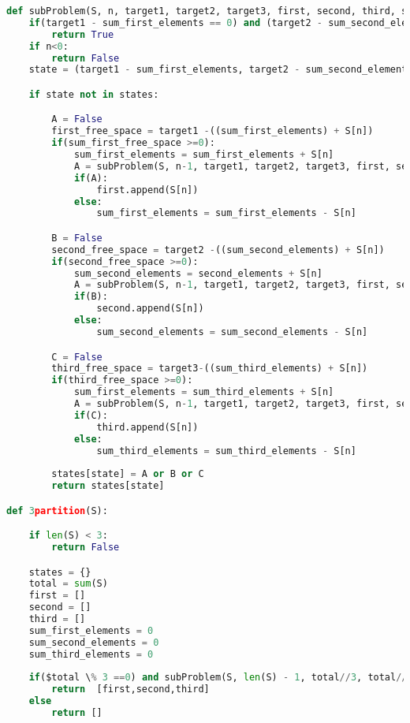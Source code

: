 \documentclass{article}
\begin{document}
\begin{lstlisting}[language=python,caption={},label={lst:uno}]
def subProblem(S, n, target1, target2, target3, first, second, third, sum_first_elements, sum_second_elements, sum_third_elements, states):
	if(target1 - sum_first_elements == 0) and (target2 - sum_second_elements ==0) and (target3 - sum_third_elements ==0):
		return True
	if n<0:
		return False
	state = (target1 - sum_first_elements, target2 - sum_second_elements, target3 - sum_third_elements, n)

	if state not in states:

		A = False
		first_free_space = target1 -((sum_first_elements) + S[n])
		if(sum_first_free_space >=0):
			sum_first_elements = sum_first_elements + S[n]
			A = subProblem(S, n-1, target1, target2, target3, first, second, third, sum_first_elements, sum_second_elements, sum_third_elements, states)
			if(A):
				first.append(S[n])
			else:
				sum_first_elements = sum_first_elements - S[n]

		B = False
		second_free_space = target2 -((sum_second_elements) + S[n])
		if(second_free_space >=0):
			sum_second_elements = second_elements + S[n]
			A = subProblem(S, n-1, target1, target2, target3, first, second, third, sum_first_elements, sum_second_elements, sum_third_elements, states)
			if(B):
				second.append(S[n])
			else:
				sum_second_elements = sum_second_elements - S[n]

		C = False
		third_free_space = target3-((sum_third_elements) + S[n])
		if(third_free_space >=0):
			sum_first_elements = sum_third_elements + S[n]
			A = subProblem(S, n-1, target1, target2, target3, first, second, third, sum_first_elements ,sum_second_elements, sum_third_elements, states)
			if(C):
				third.append(S[n])
			else:
				sum_third_elements = sum_third_elements - S[n]
		
		states[state] = A or B or C
		return states[state]

def 3partition(S):

	if len(S) < 3:
		return False

	states = {}
	total = sum(S)
	first = []
	second = []
	third = []
	sum_first_elements = 0
	sum_second_elements = 0
	sum_third_elements = 0
	
	if($total \% 3 ==0) and subProblem(S, len(S) - 1, total//3, total//3, total//3, first, second, third, sum_first_elements, sum_second_elements, sum_third_elements, states):
		return  [first,second,third]
	else
		return []

		
\end{lstlisting}
\newpage
\end{document}
